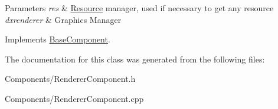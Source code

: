 \begin{DoxyParams}{Parameters}
{\em res} & \hyperlink{structResource}{Resource} manager, used if necessary to get any resource \\
\hline
{\em dxrenderer} & Graphic\textquotesingle{}s Manager \\
\hline
\end{DoxyParams}


Implements \hyperlink{classBaseComponent}{Base\+Component}.



The documentation for this class was generated from the following files\+:\begin{DoxyCompactItemize}
\item 
Components/Renderer\+Component.\+h\item 
Components/Renderer\+Component.\+cpp\end{DoxyCompactItemize}
